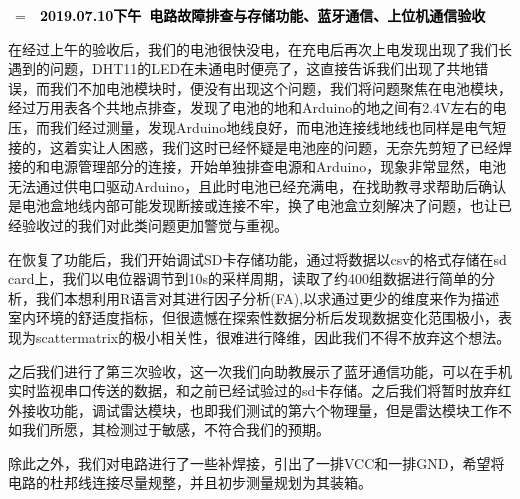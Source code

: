 \documentclass[a4paper, 11pt]{article} %
\makeatletter
\newlength\sidebar
\newlength\envborder
\def\esefcolorbox#1#{\esecolor@fbox{#1}}
\def\esecolor@fbox#1#2#3{%
   \color@b@x{\fboxsep\z@\color#1{#2}\fboxs}{\color#1{#3}}}
\newenvironment{eseframed}{%
   \def\FrameCommand{\fboxrule=\the\sidebar  \fboxsep=\the\envborder%
   \esefcolorbox{exampleborder}{examplebg}}%
   \MakeFramed{\FrameRestore}}%
  {\endMakeFramed}
\newcounter{diary}
\newenvironment{diary}[2]
 {\par\medskip\refstepcounter{diary}%
 \hbox{%
 \fboxsep=\the\sidebar\hspace{-\envborder}\hspace{-0.5\sidebar}%
 \colorbox{exampleborder}{%
 \hspace{\envborder}\footnotesize\sffamily\bfseries%
 \textcolor{black}{{#1}\ {#2}\enspace\hspace{\envborder}}
 }
 }
 \nointerlineskip\vspace{-\topsep}%
 \begin{eseframed}\noindent\ignorespaces%
 }
 {\end{eseframed}\vspace{-\baselineskip}\medskip}
\makeatother
\begin{document}
\begin{diary}{2019.07.10下午}{电路故障排查与存储功能、蓝牙通信、上位机通信验收}

在经过上午的验收后，我们的电池很快没电，在充电后再次上电发现出现了我们长遇到的问题，DHT11的LED在未通电时便亮了，这直接告诉我们出现了共地错误，而我们不加电池模块时，便没有出现这个问题，我们将问题聚焦在电池模块，经过万用表各个共地点排查，发现了电池的地和Arduino的地之间有2.4V左右的电压，而我们经过测量，发现Arduino地线良好，而电池连接线地线也同样是电气短接的，这着实让人困惑，我们这时已经怀疑是电池座的问题，无奈先剪短了已经焊接的和电源管理部分的连接，开始单独排查电源和Arduino，现象非常显然，电池无法通过供电口驱动Arduino，且此时电池已经充满电，在找助教寻求帮助后确认是电池盒地线内部可能发现断接或连接不牢，换了电池盒立刻解决了问题，也让已经验收过的我们对此类问题更加警觉与重视。

在恢复了功能后，我们开始调试SD卡存储功能，通过将数据以csv的格式存储在sd card上，我们以电位器调节到10s的采样周期，读取了约400组数据进行简单的分析，我们本想利用R语言对其进行因子分析(FA),以求通过更少的维度来作为描述室内环境的舒适度指标，但很遗憾在探索性数据分析后发现数据变化范围极小，表现为scattermatrix的极小相关性，很难进行降维，因此我们不得不放弃这个想法。

之后我们进行了第三次验收，这一次我们向助教展示了蓝牙通信功能，可以在手机实时监视串口传送的数据，和之前已经试验过的sd卡存储。之后我们将暂时放弃红外接收功能，调试雷达模块，也即我们测试的第六个物理量，但是雷达模块工作不如我们所愿，其检测过于敏感，不符合我们的预期。

除此之外，我们对电路进行了一些补焊接，引出了一排VCC和一排GND，希望将电路的杜邦线连接尽量规整，并且初步测量规划为其装箱。

\end{diary}
\end{document}
